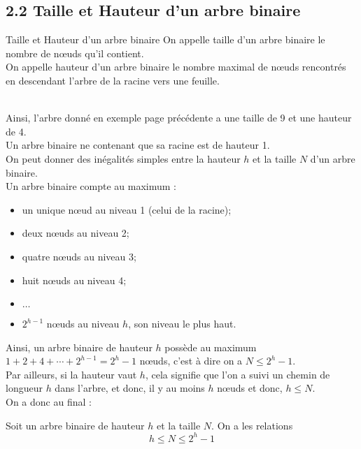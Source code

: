 \documentclass[11pt,a4paper,french,twoside]{PMCours}
\begin{document}
\subsection*{2.2 Taille et Hauteur d'un arbre binaire}
\begin{Definition}{Taille et Hauteur d'un arbre binaire}
On appelle {\color{red} taille d'un arbre binaire} le nombre de nœuds qu'il contient.\\
On appelle {\color{red} hauteur d'un arbre binaire} le nombre maximal de nœuds rencontrés en descendant l'arbre de la racine vers une feuille.
\end{Definition}\medskip\\
Ainsi, l'arbre donné en exemple page précédente a une taille de 9 et une hauteur de 4.\\
Un arbre binaire ne contenant que sa racine est de hauteur 1.\medskip\\ 
On peut donner des inégalités simples entre la hauteur $h$ et la taille $N$ d'un arbre binaire.\\
Un arbre binaire compte au maximum :
\begin{itemize}
\item un unique nœud au niveau 1 (celui de la racine);
\item deux nœuds au niveau 2;
\item quatre nœuds au niveau 3;
\item huit nœuds au niveau 4;
\item $\ldots$
\item $2^{h-1}$ nœuds au niveau $h$, son niveau le plus haut.
\end{itemize}
Ainsi, un arbre binaire de hauteur $h$ possède au maximum $1+2+4+\cdots+2^{h-1}=2^h-1$ nœuds, c'est à dire on a $N\leq 2^h-1$.\\
Par ailleurs, si la hauteur vaut $h$, cela signifie que l'on a suivi un chemin de longueur $h$ dans l'arbre, et donc, il y au moins $h$ nœuds et donc, $h\leq N$.\\
On a donc au final : \medskip\\
\begin{Proposition}{}
Soit un arbre binaire de hauteur $h$ et la taille $N$. On a les relations 
$$h\leq N\leq 2^h-1 $$
\end{Proposition}
\end{document}
